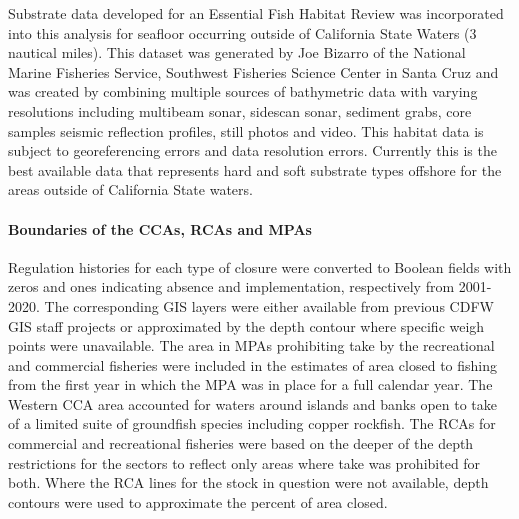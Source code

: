 \documentclass[11pt,
  english,
  a4paper,
]{article}
\begin{document}
\leavevmode\tagmcend\tagstructend\par


Substrate data developed for an Essential Fish Habitat Review was incorporated into this analysis for seafloor occurring outside of California State Waters (3 nautical miles). This dataset was generated by Joe Bizarro of the National Marine Fisheries Service, Southwest Fisheries Science Center in Santa Cruz and was created by combining multiple sources of bathymetric data with varying resolutions including multibeam sonar, sidescan sonar, sediment grabs, core samples seismic reflection profiles, still photos and video. This habitat data is subject to georeferencing errors and data resolution errors. Currently this is the best available data that represents hard and soft substrate types offshore for the areas outside of California State waters.

\leavevmode\tagmcend\tagstructend\par


\hypertarget{boundaries-of-the-ccas-rcas-and-mpas}{%
\paragraph{Boundaries of the CCAs, RCAs and MPAs}\label{boundaries-of-the-ccas-rcas-and-mpas}}

\leavevmode\tagmcend\tagstructend


Regulation histories for each type of closure were converted to Boolean fields with zeros and ones indicating absence and implementation, respectively from 2001-2020. The corresponding GIS layers were either available from previous CDFW GIS staff projects or approximated by the depth contour where specific weigh points were unavailable. The area in MPAs prohibiting take by the recreational and commercial fisheries were included in the estimates of area closed to fishing from the first year in which the MPA was in place for a full calendar year. The Western CCA area accounted for waters around islands and banks open to take of a limited suite of groundfish species including copper rockfish. The RCAs for commercial and recreational fisheries were based on the deeper of the depth restrictions for the sectors to reflect only areas where take was prohibited for both. Where the RCA lines for the stock in question were not available, depth contours were used to approximate the percent of area closed.
\end{document}
